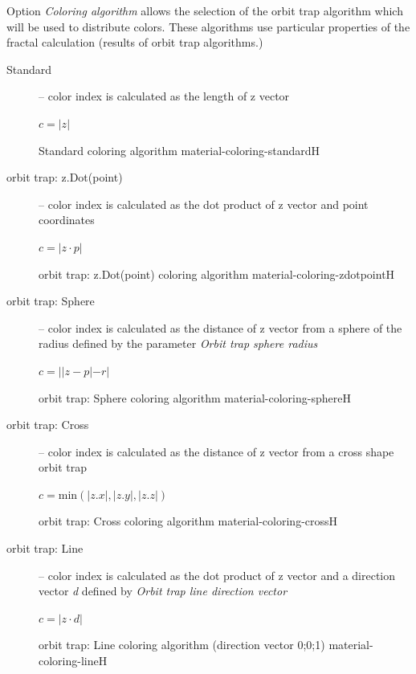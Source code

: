 Option \emph{Coloring algorithm} allows the selection of the orbit trap algorithm which will be used to distribute colors. These algorithms use particular properties of the fractal calculation (results of orbit trap algorithms.)
\pagebreak
\begin{description}
	\item[Standard] -- color index is calculated as the length of z vector
	\begin{center}
		\(c = |z|\)
	\end{center}
	{Standard coloring algorithm}
	{material-coloring-standard}{H}
	
	\item[orbit trap: z.Dot(point)] -- color index is calculated as the dot product of z vector and point coordinates
	\begin{center}
		\(c = |z \cdot p|\)
	\end{center}
	{orbit trap: z.Dot(point) coloring algorithm}
	{material-coloring-zdotpoint}{H}
	
	\item[orbit trap: Sphere] -- color index is calculated as the distance of z vector from a sphere of the radius defined by the parameter \emph{Orbit trap sphere radius}
	\begin{center}
		\(c = ||z - p|-r|\)
	\end{center}
	{orbit trap: Sphere coloring algorithm}
	{material-coloring-sphere}{H}
	
	\item[orbit trap: Cross] -- color index is calculated as the distance of z vector from a cross shape orbit trap
	\begin{center}
		\(c = \mathrm{min}(|z.x|, |z.y|, |z.z|)\)
	\end{center}
	{orbit trap: Cross coloring algorithm}
	{material-coloring-cross}{H}
	
	\item[orbit trap: Line] -- color index is calculated as the dot product of z vector and a direction vector \emph{d} defined by \emph{Orbit trap line direction vector}
	\begin{center}
		\(c = |z \cdot d|\)
	\end{center}
	{orbit trap: Line coloring algorithm (direction vector 0;0;1)}
	{material-coloring-line}{H}
\end{description}

